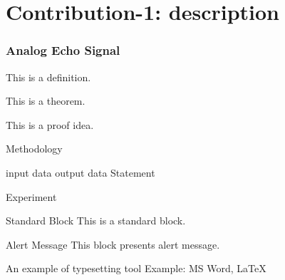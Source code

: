 \documentclass{beamer}
\begin{document}
\section{Contribution-1: description }
\begin{frame} [allowframebreaks]
\frametitle{Analog Echo Signal }

\begin{definition} 
        This is a definition.
    \end{definition}
    
    \begin{theorem} 
        This is a theorem. 
    \end{theorem}
    
    \begin{lemma} 
        This is a proof idea.
    \end{lemma}


\end{frame}






\begin{frame}{Methodology}

\begin{algorithm}[H]
\begin{algorithmic}[1]
\REQUIRE input data
\ENSURE output data 
\STATE Statement
\ENDFOR
\end{algorithmic}
\caption{pseudocode for algorithms}
\label{alg1}
\end{algorithm}


\end{frame}






    

\begin{frame}{Experiment}
    \begin{block}{Standard Block}
        This is a standard block.
    \end{block}
    \begin{alertblock}{Alert Message}
        This block presents alert message.
    \end{alertblock}
    \begin{exampleblock}{An example of typesetting tool}
        Example: MS Word, \LaTeX{}
    \end{exampleblock}
  
\end{frame}
\end{document}
